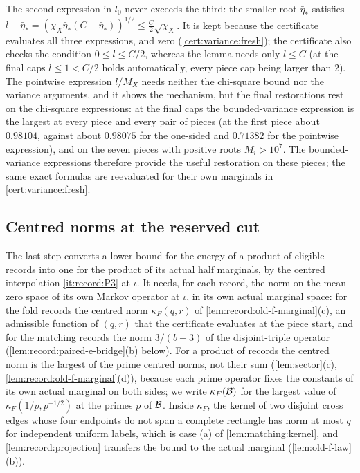 \begin{remark}\label{rem:variance:branches}
The second expression in $l_0$ never exceeds the third: the smaller root
$\bar\eta_*$ satisfies $l-\bar\eta_*=(\chi_X\bar\eta_*(C-\bar\eta_*))^{1/2}\le
\frac C2\sqrt{\chi_X}$. It is kept because the certificate evaluates all three
expressions, and zero (\cref{cert:variance:fresh}); the certificate also checks
the condition $0\le l\le C/2$, whereas the lemma needs only $l\le C$ (at the
final caps $l\le1<C/2$ holds automatically, every piece cap being larger than
$2$). The pointwise expression $l/M_X$ needs neither the chi-square bound nor the
variance arguments, and it shows the mechanism, but the final restorations rest
on the chi-square expressions: at the final caps the bounded-variance expression
is the largest at every piece and every pair of pieces (at the first piece about $0.98104$,
against about $0.98075$ for the one-sided and $0.71382$ for the pointwise
expression), and on the seven pieces with positive roots $M_i>10^7$.
The bounded-variance expressions therefore provide the useful restoration
on these pieces; the same exact formulas are reevaluated for their own
marginals in \cref{cert:variance:fresh}.
\end{remark}

\subsection{Centred norms at the reserved cut}\label{subsec:variance:centred}

The last step converts a lower bound for the energy of a product of eligible
records into one for the product of its actual half marginals, by the centred
interpolation \ref{it:record:P3} at $\iota$. It needs, for each record, the norm
on the mean-zero space of its own Markov operator at $\iota$, in its own actual
marginal space: for the fold records the centred norm $\kappa_F(q,r)$ of
\cref{lem:record:old-f-marginal}(c), an admissible function of $(q,r)$ that the
certificate evaluates at the piece start, and for the matching records the norm
$3/(b-3)$ of the disjoint-triple operator (\cref{lem:record:paired-e-bridge}(b)
below). For a product of records the centred norm is the largest of the prime
centred norms, not their sum (\cref{lem:sector}(c),
\cref{lem:record:old-f-marginal}(d)), because each prime operator fixes the
constants of its own actual marginal on both sides; we write $\kappa_F(\mathcal B)$
for the largest value of $\kappa_F(1/p,p^{-1/2})$ at the primes $p$ of $\mathcal B$.
Inside $\kappa_F$, the kernel of two disjoint cross
edges whose four endpoints do not span a complete rectangle has norm at most
$q$ for independent uniform labels, which is case (a) of
\cref{lem:matching:kernel}, and \cref{lem:record:projection} transfers the bound
to the actual marginal (\cref{lem:old-f-law}(b)).

